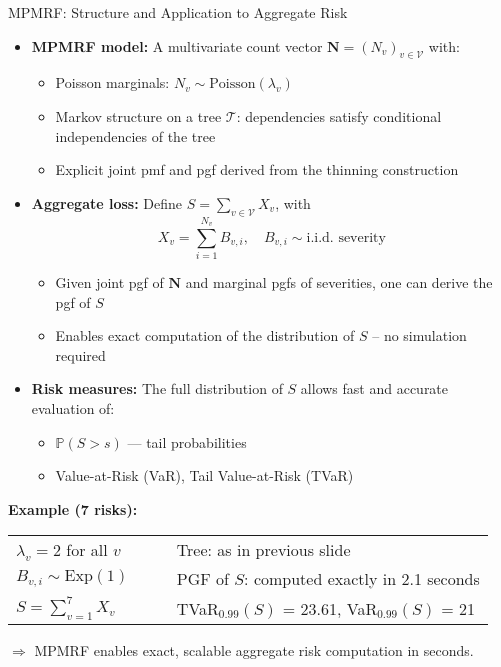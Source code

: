 \documentclass[11pt,xcolor={dvipsnames},hyperref={pdftex,pdfpagemode=UseNone,hidelinks,pdfdisplaydoctitle=true},usepdftitle=false]{beamer}
\begin{document}
\begin{frame}{MPMRF: Structure and Application to Aggregate Risk}

\begin{itemize}
    \item \textbf{MPMRF model:} A multivariate count vector $\boldsymbol{N} = (N_v)_{v \in \mathcal{V}}$ with:
    \begin{itemize}
        \item Poisson marginals: $N_v \sim \text{Poisson}(\lambda_v)$
        \item Markov structure on a tree $\mathcal{T}$: dependencies satisfy conditional independencies of the tree
        \item Explicit joint pmf and pgf derived from the thinning construction
    \end{itemize}
    
    \pause
    
    \item \textbf{Aggregate loss:} Define $S = \sum_{v \in \mathcal{V}} X_v$, with
    \[
    X_v = \sum_{i=1}^{N_v} B_{v,i}, \quad B_{v,i} \sim \text{i.i.d. severity}
    \]
    \begin{itemize}
        \item Given joint pgf of $\boldsymbol{N}$ and marginal pgfs of severities, one can derive the pgf of $S$
        \item Enables exact computation of the distribution of $S$ – no simulation required
    \end{itemize}
    
    \pause
    
    \item \textbf{Risk measures:} The full distribution of $S$ allows fast and accurate evaluation of:
    \begin{itemize}
        \item $\mathbb{P}(S > s)$ — tail probabilities
        \item Value-at-Risk (VaR), Tail Value-at-Risk (TVaR)
    \end{itemize}
    
\end{itemize}

\vspace{0.8em}
\textbf{Example (7 risks):}  
\vspace{0.3em}

{\scriptsize
\begin{tabular}{lcl}
$\lambda_v = 2$ for all $v$ & $\quad$ & Tree: as in previous slide \\
$B_{v,i} \sim \text{Exp}(1)$ & & PGF of $S$: computed exactly in 2.1 seconds \\
$S = \sum_{v=1}^{7} X_v$ & & TVaR$_{0.99}(S)$ = 23.61, VaR$_{0.99}(S)$ = 21
\end{tabular}
}

\vspace{0.3em}
{\footnotesize
$\Rightarrow$ MPMRF enables exact, scalable aggregate risk computation in seconds.
}

\end{frame}
\end{document}
